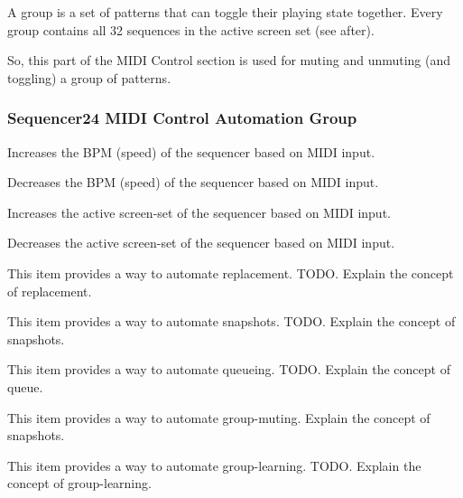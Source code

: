    A group is a set of patterns that can toggle their playing state
   together.  Every group contains all 32 sequences in the active screen set
   (see after).

   So, this part of the MIDI Control section is used for muting and unmuting
   (and toggling) a group of patterns.

\subsubsection{Sequencer24 MIDI Control Automation Group}
\label{subsubsec:seq24_rc_file_midi_control_automation_group}


   \setcounter{ItemCounter}{0}      %

   Increases the BPM (speed) of the sequencer based on MIDI input.

   Decreases the BPM (speed) of the sequencer based on MIDI input.

   Increases the active screen-set of the sequencer based on MIDI input.

   Decreases the active screen-set of the sequencer based on MIDI input.

   This item provides a way to automate replacement.
   TODO.
   Explain the concept of replacement.

   This item provides a way to automate snapshots.
   TODO.
   Explain the concept of snapshots.

   This item provides a way to automate queueing.
   TODO.
   Explain the concept of queue.

   This item provides a way to automate group-muting.
   Explain the concept of snapshots.

   This item provides a way to automate group-learning.
   TODO.
   Explain the concept of group-learning.

